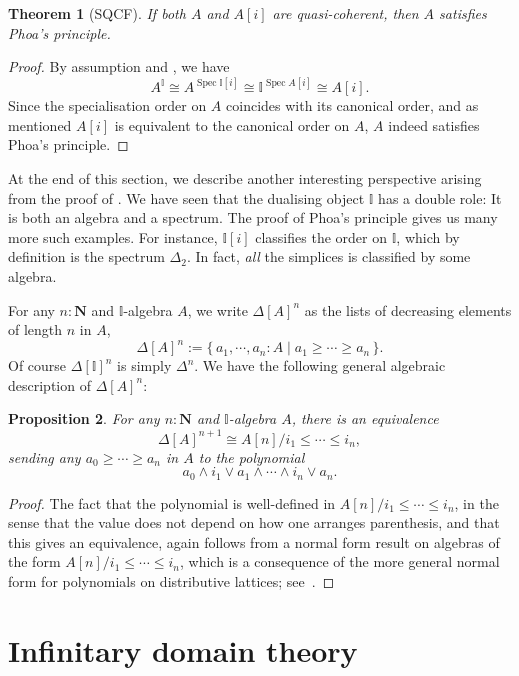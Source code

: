 \documentclass[12pt]{amsart}
\newtheorem{theorem}{Theorem}[section]
\newtheorem{proposition}[theorem]{Proposition}
\theoremstyle{definition}
\newcommand{\mb}[1]{\mathbf{#1}}
\newcommand{\mbb}[1]{\mathbb{#1}}
\newcommand{\I}{\mbb I}
\newcommand{\scomp}[2]{\{\,#1\mid#2\,\}}
\newcommand{\N}{\mb N}
\newcommand{\spec}{\operatorname{Spec}}
\begin{document}
\begin{theorem}[SQCF]\label{thm:algebraphoa}
  If both $A$ and $A[i]$ are quasi-coherent, then $A$ satisfies Phoa's principle.
\end{theorem}
\begin{proof}
  By assumption and , we have
  \[ A^\I \cong A^{\spec \I[i]} \cong \I^{\spec A[i]} \cong A[i]. \]
  Since the specialisation order on $A$ coincides with its canonical order, and as mentioned $A[i]$ is equivalent to the canonical order on $A$, $A$ indeed satisfies Phoa's principle.
\end{proof}

At the end of this section, we describe another interesting perspective arising from the proof of . We have seen that the dualising object $\I$ has a double role: It is both an algebra and a spectrum. The proof of Phoa's principle gives us many more such examples. For instance, $\I[i]$ classifies the order on $\I$, which by definition is the spectrum $\Delta_2$. In fact, \emph{all} the simplices is classified by some algebra.

For any $n : \N$ and $\I$-algebra $A$, we write $\Delta[A]^{n}$ as the lists of decreasing elements of length $n$ in $A$,
\[ \Delta[A]^{n} := \scomp{a_1,\cdots,a_n : A}{a_1 \ge \cdots \ge a_n}. \]
Of course $\Delta[\I]^n$ is simply $\Delta^n$. We have the following general algebraic description of $\Delta[A]^n$:

\begin{proposition}\label{prop:simplicesasalgebra}
  For any $n : \N$ and $\I$-algebra $A$, there is an equivalence 
  \[ \Delta[A]^{n+1} \cong A[n]/i_1 \le \cdots \le i_n, \]
  sending any $a_0 \ge \cdots \ge a_n$ in $A$ to the polynomial 
  \[ a_0 \wedge i_1 \vee a_1 \wedge \cdots \wedge i_n \vee a_n. \]
\end{proposition}
\begin{proof}
  The fact that the polynomial is well-defined in $A[n]/i_1 \le \cdots \le i_n$, in the sense that the value does not depend on how one arranges parenthesis, and that this gives an equivalence, again follows from a normal form result on algebras of the form $A[n]/i_1 \le \cdots \le i_n$, which is a consequence of the more general normal form for polynomials on distributive lattices; see~\cite[Thm. 10.21]{lausch2000algebra}.
\end{proof}

\section{Infinitary domain theory}\label{sec:infdomain}
\end{document}
